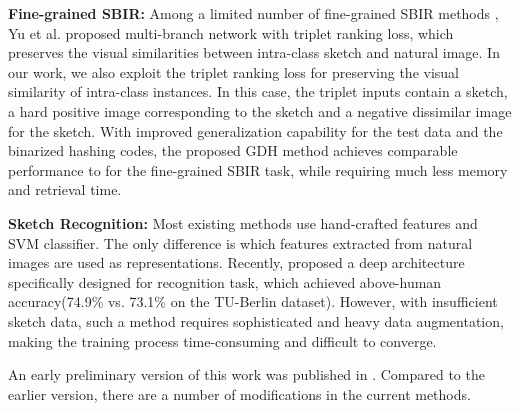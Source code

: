 \noindent\textbf{Fine-grained SBIR:} Among a limited number of fine-grained SBIR methods \cite{Yu2016shoes,SangkloyBHH16,SongYSXH17,BuiRPC16,XuYHSMWXKG18,LiPSHZH16,QiSZL16,XuYQSMWG16,LiPSHXZ17}, Yu et al. \cite{Yu2016shoes} proposed multi-branch network with triplet ranking loss, which preserves the visual similarities between intra-class sketch and natural image. In our work, we also exploit the triplet ranking loss for preserving the visual similarity of intra-class instances. 
In this case, the triplet inputs
contain a sketch, a hard positive image corresponding to the sketch and a negative dissimilar image for the sketch.
With improved generalization capability for the test data and the binarized hashing codes, the proposed GDH method achieves comparable performance to \cite{Yu2016shoes} for the fine-grained SBIR task, while requiring much less memory and retrieval time. 

\noindent\textbf{Sketch Recognition:} Most existing methods\cite{EitzHA12,SimonyanZ14a} use hand-crafted
features and SVM classifier. The only difference is which features
extracted from natural images are used as representations. Recently, \cite{sketchanet}
proposed a deep architecture specifically designed for recognition task, which achieved above-human accuracy(74.9\% vs. 73.1\% on the TU-Berlin dataset).
However, with insufficient sketch data, such a method requires sophisticated and heavy data augmentation, making the training process time-consuming and difficult to converge.



An early preliminary version of this work was published
in \cite{GDH}. Compared to the earlier version, there are a number of
modifications in the current methods.